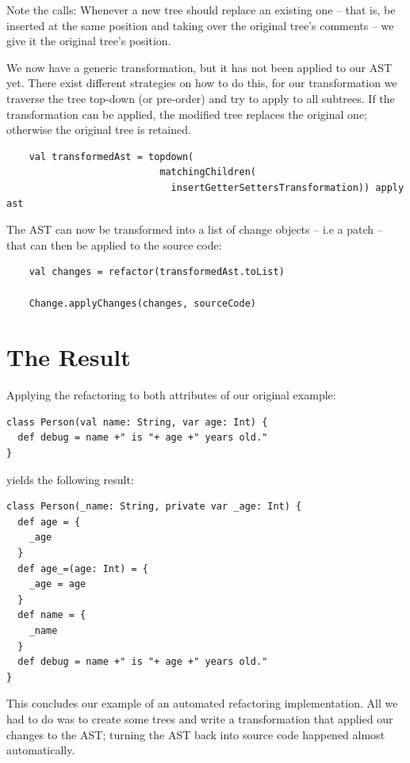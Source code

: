 \documentclass[10pt,a4paper,oneside]{scrreprt}
\begin{document}
Note the  calls: Whenever a new tree should replace an existing one -- that is, be inserted at the same position and taking over the original tree's comments -- we give it the original tree's position.

We now have a generic transformation, but it has not been applied to our AST yet. There exist different strategies on how to do this, for our transformation we traverse the tree top-down (or pre-order) and try to apply  to all subtrees. If the transformation can be applied, the modified tree replaces the original one; otherwise the original tree is retained.

\begin{lstlisting}
    val transformedAst = topdown(
                           matchingChildren(
                             insertGetterSettersTransformation)) apply ast
\end{lstlisting}
    
The AST can now be transformed into a list of change objects -- i.e a patch -- that can then be applied to the source code:

\begin{lstlisting}
    val changes = refactor(transformedAst.toList)
    
    Change.applyChanges(changes, sourceCode)
\end{lstlisting}

\section{The Result}

Applying the refactoring to both attributes of our original example:

\begin{lstlisting}
class Person(val name: String, var age: Int) {
  def debug = name +" is "+ age +" years old."
}
\end{lstlisting}

yields the following result:

\begin{lstlisting}
class Person(_name: String, private var _age: Int) {
  def age = {
    _age
  }
  def age_=(age: Int) = {
    _age = age
  }
  def name = {
    _name
  }
  def debug = name +" is "+ age +" years old."
}
\end{lstlisting}

This concludes our example of an automated refactoring implementation. All we had to do was to create some trees and write a transformation that applied our changes to the AST; turning the AST back into source code happened almost automatically.
\end{document}
